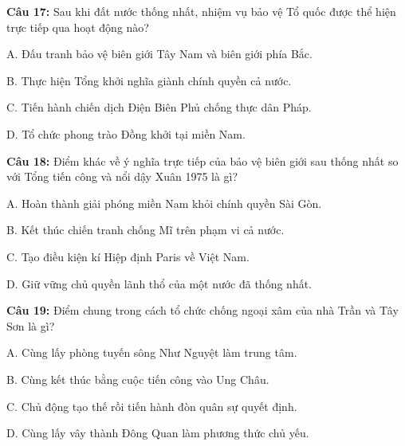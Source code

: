 \documentclass[12pt,a4paper]{article}
\begin{document}
\par\noindent\begin{minipage}{\linewidth}
\noindent\textbf{Câu 17:} Sau khi đất nước thống nhất, nhiệm vụ bảo vệ Tổ quốc được thể hiện trực tiếp qua hoạt động nào?\par
\noindent A. Đấu tranh bảo vệ biên giới Tây Nam và biên giới phía Bắc.\par
\noindent B. Thực hiện Tổng khởi nghĩa giành chính quyền cả nước.\par
\noindent C. Tiến hành chiến dịch Điện Biên Phủ chống thực dân Pháp.\par
\noindent D. Tổ chức phong trào Đồng khởi tại miền Nam.\par
\end{minipage}\par\vspace{0.12cm}

\par\noindent\begin{minipage}{\linewidth}
\noindent\textbf{Câu 18:} Điểm khác về ý nghĩa trực tiếp của bảo vệ biên giới sau thống nhất so với Tổng tiến công và nổi dậy Xuân 1975 là gì?\par
\noindent A. Hoàn thành giải phóng miền Nam khỏi chính quyền Sài Gòn.\par
\noindent B. Kết thúc chiến tranh chống Mĩ trên phạm vi cả nước.\par
\noindent C. Tạo điều kiện kí Hiệp định Paris về Việt Nam.\par
\noindent D. Giữ vững chủ quyền lãnh thổ của một nước đã thống nhất.\par
\end{minipage}\par\vspace{0.12cm}

\par\noindent\begin{minipage}{\linewidth}
\noindent\textbf{Câu 19:} Điểm chung trong cách tổ chức chống ngoại xâm của nhà Trần và Tây Sơn là gì?\par
\noindent A. Cùng lấy phòng tuyến sông Như Nguyệt làm trung tâm.\par
\noindent B. Cùng kết thúc bằng cuộc tiến công vào Ung Châu.\par
\noindent C. Chủ động tạo thế rồi tiến hành đòn quân sự quyết định.\par
\noindent D. Cùng lấy vây thành Đông Quan làm phương thức chủ yếu.\par
\end{minipage}\par\vspace{0.12cm}
\end{document}
